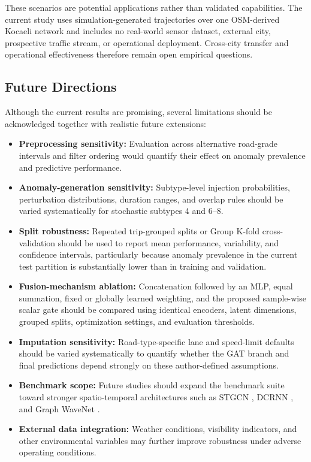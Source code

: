 \documentclass[journal]{IEEEtran}
\begin{document}
These scenarios are potential applications rather than validated capabilities. The current study uses simulation-generated trajectories over one OSM-derived Kocaeli network and includes no real-world sensor dataset, external city, prospective traffic stream, or operational deployment. Cross-city transfer and operational effectiveness therefore remain open empirical questions.

\subsection{Future Directions}
\label{sec:future_directions}
Although the current results are promising, several limitations should be acknowledged together with realistic future extensions:
\begin{itemize}
  \item \textbf{Preprocessing sensitivity:} Evaluation across alternative road-grade intervals and filter ordering would quantify their effect on anomaly prevalence and predictive performance.
  \item \textbf{Anomaly-generation sensitivity:} Subtype-level injection probabilities, perturbation distributions, duration ranges, and overlap rules should be varied systematically for stochastic subtypes 4 and 6--8.
  \item \textbf{Split robustness:} Repeated trip-grouped splits or Group K-fold cross-validation should be used to report mean performance, variability, and confidence intervals, particularly because anomaly prevalence in the current test partition is substantially lower than in training and validation.
  \item \textbf{Fusion-mechanism ablation:} Concatenation followed by an MLP, equal summation, fixed or globally learned weighting, and the proposed sample-wise scalar gate should be compared using identical encoders, latent dimensions, grouped splits, optimization settings, and evaluation thresholds.
  \item \textbf{Imputation sensitivity:} Road-type-specific lane and speed-limit defaults should be varied systematically to quantify whether the GAT branch and final predictions depend strongly on these author-defined assumptions.
  \item \textbf{Benchmark scope:} Future studies should expand the benchmark suite toward stronger spatio-temporal architectures such as STGCN \cite{yu_spatio-temporal_2018}, DCRNN \cite{li_diffusion_2018}, and Graph WaveNet \cite{wu_graph_2019}.
  \item \textbf{External data integration:} Weather conditions, visibility indicators, and other environmental variables may further improve robustness under adverse operating conditions.

\end{itemize}
\end{document}
